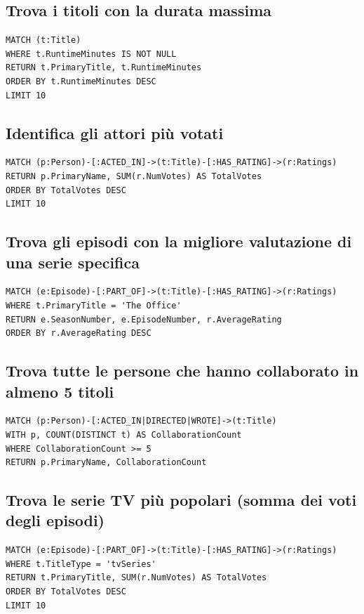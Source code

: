 \documentclass[a4paper,12pt]{article}
\begin{document}
\subsection{Trova i titoli con la durata massima}
\begin{verbatim}
MATCH (t:Title)
WHERE t.RuntimeMinutes IS NOT NULL
RETURN t.PrimaryTitle, t.RuntimeMinutes
ORDER BY t.RuntimeMinutes DESC
LIMIT 10
\end{verbatim}

\subsection{Identifica gli attori più votati}
\begin{verbatim}
MATCH (p:Person)-[:ACTED_IN]->(t:Title)-[:HAS_RATING]->(r:Ratings)
RETURN p.PrimaryName, SUM(r.NumVotes) AS TotalVotes
ORDER BY TotalVotes DESC
LIMIT 10
\end{verbatim}

\subsection{Trova gli episodi con la migliore valutazione di una serie specifica}
\begin{verbatim}
MATCH (e:Episode)-[:PART_OF]->(t:Title)-[:HAS_RATING]->(r:Ratings)
WHERE t.PrimaryTitle = 'The Office'
RETURN e.SeasonNumber, e.EpisodeNumber, r.AverageRating
ORDER BY r.AverageRating DESC
\end{verbatim}

\subsection{Trova tutte le persone che hanno collaborato in almeno 5 titoli}
\begin{verbatim}
MATCH (p:Person)-[:ACTED_IN|DIRECTED|WROTE]->(t:Title)
WITH p, COUNT(DISTINCT t) AS CollaborationCount
WHERE CollaborationCount >= 5
RETURN p.PrimaryName, CollaborationCount
\end{verbatim}

\subsection{Trova le serie TV più popolari (somma dei voti degli episodi)}
\begin{verbatim}
MATCH (e:Episode)-[:PART_OF]->(t:Title)-[:HAS_RATING]->(r:Ratings)
WHERE t.TitleType = 'tvSeries'
RETURN t.PrimaryTitle, SUM(r.NumVotes) AS TotalVotes
ORDER BY TotalVotes DESC
LIMIT 10
\end{verbatim}
\end{document}
